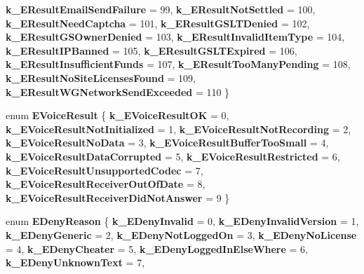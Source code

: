 \begin{DoxyCompactItemize}
{\bfseries k\+\_\+\+E\+Result\+Email\+Send\+Failure} = 99, 
{\bfseries k\+\_\+\+E\+Result\+Not\+Settled} = 100, 
{\bfseries k\+\_\+\+E\+Result\+Need\+Captcha} = 101, 
\newline
{\bfseries k\+\_\+\+E\+Result\+G\+S\+L\+T\+Denied} = 102, 
{\bfseries k\+\_\+\+E\+Result\+G\+S\+Owner\+Denied} = 103, 
{\bfseries k\+\_\+\+E\+Result\+Invalid\+Item\+Type} = 104, 
{\bfseries k\+\_\+\+E\+Result\+I\+P\+Banned} = 105, 
\newline
{\bfseries k\+\_\+\+E\+Result\+G\+S\+L\+T\+Expired} = 106, 
{\bfseries k\+\_\+\+E\+Result\+Insufficient\+Funds} = 107, 
{\bfseries k\+\_\+\+E\+Result\+Too\+Many\+Pending} = 108, 
{\bfseries k\+\_\+\+E\+Result\+No\+Site\+Licenses\+Found} = 109, 
\newline
{\bfseries k\+\_\+\+E\+Result\+W\+G\+Network\+Send\+Exceeded} = 110
 \}
\item 
\mbox{\label{namespace_valve_1_1_steamworks_a328dee63741e7399afa267adf134f116}} 
enum {\bfseries E\+Voice\+Result} \{ \newline
{\bfseries k\+\_\+\+E\+Voice\+Result\+OK} = 0, 
{\bfseries k\+\_\+\+E\+Voice\+Result\+Not\+Initialized} = 1, 
{\bfseries k\+\_\+\+E\+Voice\+Result\+Not\+Recording} = 2, 
{\bfseries k\+\_\+\+E\+Voice\+Result\+No\+Data} = 3, 
\newline
{\bfseries k\+\_\+\+E\+Voice\+Result\+Buffer\+Too\+Small} = 4, 
{\bfseries k\+\_\+\+E\+Voice\+Result\+Data\+Corrupted} = 5, 
{\bfseries k\+\_\+\+E\+Voice\+Result\+Restricted} = 6, 
{\bfseries k\+\_\+\+E\+Voice\+Result\+Unsupported\+Codec} = 7, 
\newline
{\bfseries k\+\_\+\+E\+Voice\+Result\+Receiver\+Out\+Of\+Date} = 8, 
{\bfseries k\+\_\+\+E\+Voice\+Result\+Receiver\+Did\+Not\+Answer} = 9
 \}
\item 
\mbox{\label{namespace_valve_1_1_steamworks_a5acc0114c8cecc09f73bd28d48ce9f9a}} 
enum {\bfseries E\+Deny\+Reason} \{ \newline
{\bfseries k\+\_\+\+E\+Deny\+Invalid} = 0, 
{\bfseries k\+\_\+\+E\+Deny\+Invalid\+Version} = 1, 
{\bfseries k\+\_\+\+E\+Deny\+Generic} = 2, 
{\bfseries k\+\_\+\+E\+Deny\+Not\+Logged\+On} = 3, 
\newline
{\bfseries k\+\_\+\+E\+Deny\+No\+License} = 4, 
{\bfseries k\+\_\+\+E\+Deny\+Cheater} = 5, 
{\bfseries k\+\_\+\+E\+Deny\+Logged\+In\+Else\+Where} = 6, 
{\bfseries k\+\_\+\+E\+Deny\+Unknown\+Text} = 7, 

\end{DoxyCompactItemize}
